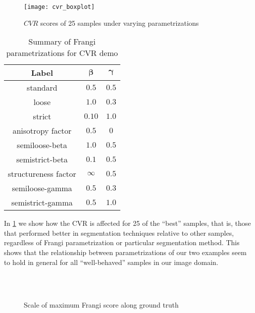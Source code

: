 \begin{figure}[p]\centering
	\texttt{[image: cvr\_boxplot]}
	\caption{$CVR$ scores of 25 samples under varying parametrizations}
  \label{fig:CVR-boxplot-quality0}
\end{figure}

\begin{table}[p]\centering
	\begin{tabular}{|c|c|c|}
		\hline
		\textbf{Label}  & $\bm{\beta}$ & $\bm{\gamma}$ \\ \hline
		standard & $0.5$ & $0.5$ \\ \hline
		loose & $ 1.0$ & $0.3$ \\ \hline
		strict & $0.10$ & $1.0$ \\ \hline
		anisotropy factor & $ 0.5$& $0$ \\ \hline
		semiloose-beta &$ 1.0$ & $0.5$ \\ \hline
		semistrict-beta& $ 0.1$ &$ 0.5$ \\ \hline
		structureness factor& $ \infty$ & $0.5$ \\ \hline
		semiloose-gamma &$ 0.5$ & $0.3$ \\ \hline
		semistrict-gamma& $ 0.5$ & $1.0$ \\ \hline
	\end{tabular}
	\caption{Summary of Frangi parametrizations for CVR demo} 
	\label{tab:cvr-demo-parametrizations}
\end{table}

In \cref{fig:CVR-boxplot-quality0} we show how the CVR is affected for 25 of the ``best'' samples, that is, those that performed better in segmentation techniques relative to other samples, regardless of Frangi parametrization or particular segmentation method. This shows that the relationship between parametrizations of our two examples seem to hold in general for all ``well-behaved'' samples in our image domain.

\begin{figure}[p]\centering
	 \\
	 \\
  \caption{Scale of maximum Frangi score along ground truth}
  \label{fig:Vargmax}
\end{figure}


